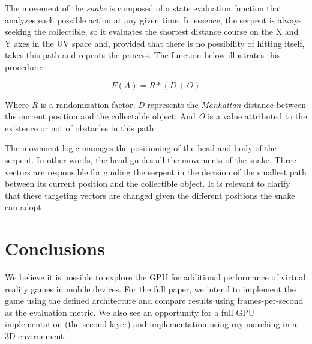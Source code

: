 \documentclass[12pt]{article}
\begin{document}
The movement of the \textit{snake} is composed of a state evaluation function that analyzes each possible action at any given time. In essence, the serpent is always seeking  the collectible, so it evaluates the shortest distance course on the X and Y axes in the UV space and, provided that there is no possibility of hitting itself, takes this path and repeats the process. The function below illustrates this procedure:

\begin{equation}
F(A) = R * (D + O)
\label{equation11}
\end{equation}

Where \textit{R} is a randomization factor; \textit{D} represents the \textit{Manhattan} distance between the current position and the collectable object; And \textit{O} is a value attributed to the existence or not of obstacles in this path.

The movement logic manages the positioning of the head and body of the serpent.  In other words, the head guides all the movements of the snake. Three vectors are  responsible for guiding the serpent in the decision of the smallest path between its current position and the collectible object. It is relevant to clarify that these targeting vectors are changed given the different positions the snake can adopt

\section{Conclusions}
We believe it is possible to explore the GPU for additional performance of virtual reality games in mobile devices. For the full paper, we intend to implement the game using the defined architecture and compare results using frames-per-second as the evaluation metric. We also see an opportunity for a full GPU implementation (the second layer) and implementation using ray-marching in a 3D environment.



\end{document}

